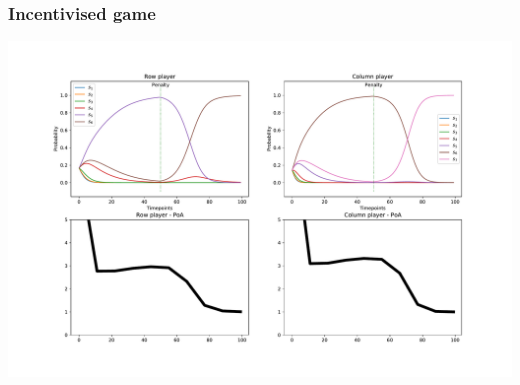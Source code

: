 \begin{frame}
    \frametitle{Incentivised game}

    \centering
    \includegraphics[scale=0.28]{Bin/penalised_game.pdf}

\end{frame}
